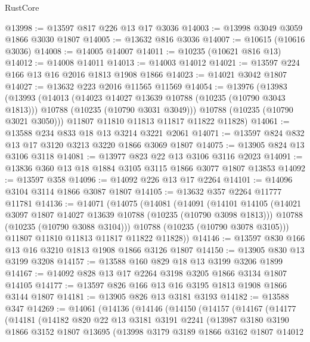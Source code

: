 \begin{lexlean}{RustCore}
\begin{coremodule}
@13998 := @13597 @817 @226 @13 @17 @3036
@14003 := @13998 @3049 @3059 @1866 @3030 @1807
@14005 := @13632 @816 @3036
@14007 := @10615 (@10616 @3036)
@14008 := @14005 @14007
@14011 := @10235 (@10621 @816 @13)
@14012 := @14008 @14011
@14013 := @14003 @14012
@14021 := @13597 @224 @166 @13 @16 @2016 @1813 @1908 @1866
@14023 := @14021 @3042 @1807
@14027 := @13632 @223 @2016 @11565 @11569
@14054 := @13976
    (@13983
      (@13993
        (@14013
          (@14023 @14027 @13639 @10788 (@10235 (@10790 @3043 @1813)))
          @10788
          (@10235 (@10790 @3031 @3049)))
        @10788
        (@10235 (@10790 @3021 @3050)))
      @11807
      @11810
      @11813
      @11817
      @11822
      @11828)
@14061 := @13588 @234 @833 @18 @13 @3214 @3221 @2061
@14071 := @13597 @824 @832 @13 @17 @3120 @3213 @3220 @1866 @3069 @1807
@14075 := @13905 @824 @13 @3106 @3118
@14081 := @13977 @823 @22 @13 @3106 @3116 @2023
@14091 := @13836 @360 @13 @18 @1884 @3105 @3115 @1866 @3077 @1807 @13853
@14092 := @13597 @358
@14096 := @14092 @226 @13 @17 @2264
@14101 := @14096 @3104 @3114 @1866 @3087 @1807
@14105 := @13632 @357 @2264 @11777 @11781
@14136 := @14071
    (@14075
      (@14081
        (@14091
          (@14101
            @14105
            (@14021 @3097 @1807 @14027 @13639 @10788 (@10235 (@10790 @3098 @1813)))
            @10788
            (@10235 (@10790 @3088 @3104)))
          @10788
          (@10235 (@10790 @3078 @3105)))
        @11807
        @11810
        @11813
        @11817
        @11822
        @11828))
@14146 := @13597 @830 @166 @13 @16 @3210 @1813 @1908 @1866 @3126 @1807
@14150 := @13905 @830 @13 @3199 @3208
@14157 := @13588 @160 @829 @18 @13 @3199 @3206 @1899
@14167 := @14092 @828 @13 @17 @2264 @3198 @3205 @1866 @3134 @1807 @14105
@14177 := @13597 @826 @166 @13 @16 @3195 @1813 @1908 @1866 @3144 @1807
@14181 := @13905 @826 @13 @3181 @3193
@14182 := @13588 @347
@14269 := @14061
    (@14136
      (@14146
        (@14150
          (@14157
            (@14167
              (@14177
                (@14181
                  (@14182
                    @820
                    @22
                    @13
                    @3181
                    @3191
                    @2241
                    (@13987
                      @3180
                      @3190
                      @1866
                      @3152
                      @1807
                      @13695
                      (@13998
                        @3179
                        @3189
                        @1866
                        @3162
                        @1807
                        @14012

\end{coremodule}
\end{lexlean}
